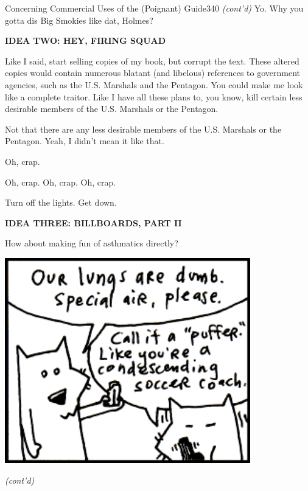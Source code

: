 \documentclass[12pt,twoside]{report}
\begin{document}
	\begin{sidebar}{Concerning Commercial Uses of the (Poignant) Guide}{340}
		\textit{(cont'd)} Yo. Why you gotta dis Big Smokies like dat, Holmes?\vspace{6pt}
		
		\textbf{IDEA TWO: HEY, FIRING SQUAD}\vspace{6pt}
		
		Like I said, start selling copies of my book, but corrupt the text. These altered copies would contain numerous blatant (and libelous) references to government agencies, such as the U.S. Marshals and the Pentagon. You could make me look like a complete traitor. Like I have all these plans to, you know, kill certain less desirable members of the U.S. Marshals or the Pentagon.\vspace{6pt}
		
		Not that there are any less desirable members of the U.S. Marshals or the Pentagon. Yeah, I didn't mean it like that.\vspace{6pt}
		
		Oh, crap.\vspace{6pt}
		
		Oh, crap. Oh, crap. Oh, crap.\vspace{6pt}
		
		Turn off the lights. Get down.\vspace{6pt}
		
		\textbf{IDEA THREE: BILLBOARDS, PART II}\vspace{6pt}
		
		How about making fun of asthmatics directly?\vspace{6pt}
		
		\vspace{6pt}
		\hfill
		\includegraphics[width=0.8\textwidth]{cache/sidebar312.png}
		\hspace*{\fill}
		\vspace{6pt}
		
		\textit{(cont'd)} \vspace{6 pt}
	\end{sidebar}
\end{document}
